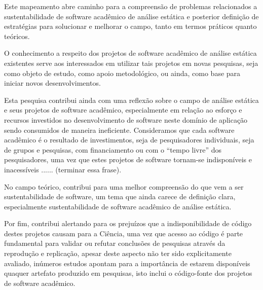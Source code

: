 Este mapeamento abre caminho para a compreensão de problemas relacionados a 
sustentabilidade de software acadêmico de análise estática 
e posterior definição de estratégias para
solucionar e melhorar o campo, tanto em termos práticos quanto teóricos.

O conhecimento a respeito dos projetos de software acadêmico de análise estática
existentes serve aos interessados em utilizar tais projetos em novas pesquisas,
seja como objeto de estudo, como apoio metodológico, ou ainda, como base para
iniciar novos desenvolvimentos.


Esta pesquisa contribui ainda com uma reflexão sobre o campo de análise
estática e seus projetos de software acadêmico, especialmente em relação ao
esforço e recursos investidos no desenvolvimento de software neste domínio de
aplicação sendo consumidos de maneira ineficiente. Consideramos que cada software
acadêmico é o resultado de investimentos, seja de pesquisadores individuais, seja
de grupos e pesquisas, com financiamento ou com o ``tempo livre'' dos pesquisadores,
uma vez que estes projetos de software tornam-se indisponíveis e inacessíveis
...... (terminar essa frase).


No campo teórico, contribui para uma melhor compreensão do que vem a ser
sustentabilidade de software, um tema que ainda carece de definição clara,
especialmente sustentabilidade de software acadêmico de análise estática.


Por fim, contribui alertando para os prejuízos que a indisponibilidade de
código destes projetos causam para a Ciência, uma vez que acesso ao código é
parte fundamental para validar ou refutar conclusões de pesquisas através da
reprodução e replicação, apesar deste aspecto não ter sido explicitamente avaliado,
inúmeros estudos apontam para a importância de estarem disponíveis quaquer
artefato produzido em pesquisas, isto inclui o código-fonte dos projetos de
software acadêmico.


